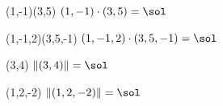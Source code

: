 \SCALARPRODUCT(1,-1)(3,5){\sol}
$(1,-1)\cdot(3,5)=\sol$

\DOTPRODUCT(1,-1,2)(3,5,-1){\sol}
$(1,-1,2)\cdot(3,5,-1)=\sol$

\VECTORNORM(3,4)\sol
$\left\|(3,4)\right\|=\sol$

\VECTORNORM(1,2,-2)\sol
$\left\|(1,2,-2)\right\|=\sol$

